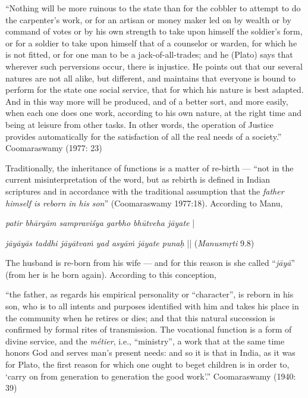 \begin{myquote}
“Nothing will be more ruinous to the state than for the cobbler to attempt to do the carpenter’s work, or for an artisan or money maker led on by wealth or by command of votes or by his own strength to take upon himself the soldier’s form, or for a soldier to take upon himself that of a counselor or warden, for which he is not fitted, or for one man to be a jack-of-all-trades; and he (Plato) says that wherever such perversions occur, there is injustice. He points out that our several natures are not all alike, but different, and maintains that everyone is bound to perform for the state one social service, that for which his nature is best adapted. And in this way more will be produced, and of a better sort, and more easily, when each one does one work, according to his own nature, at the right time and being at leisure from other tasks. In other words, the operation of Justice provides automatically for the satisfaction of all the real needs of a society.”
\hfill Coomaraswamy (1977: 23)
\end{myquote}

Traditionally, the inheritance of functions is a matter of re-birth --- “not in the current misinterpretation of the word, but as rebirth is defined in Indian scriptures and in accordance with the traditional assumption that the {\sl father himself is reborn in his son}” (Coomaraswamy 1977:18). According to Manu, 

\begin{myquote}
{{\sl patir bhāryām sampraviśya garbho bhūtveha jāyate}} |

{\sl jāyāyās taddhi jāyātvaṁ yad asyāṁ jāyate punaḥ} || ({\sl Manusmṛti} 9.8) 
\end{myquote}

The husband is re-born from his wife --- and for this reason is she called “{\sl jāyā}” (from her is he born again). According to this conception, 

\begin{myquote}
“the father, as regards his empirical personality or “character”, is reborn in his son, who is to all intents and purposes identified with him and takes his place in the community when he retires or dies; and that this natural succession is confirmed by formal rites of transmission. The vocational function is a form of divine service, and the {\sl métier}, i.e., “ministry”, a work that at the same time honors God and serves man’s present needs: and so it is that in India, as it was for Plato, the first reason for which one ought to beget children is in order to, ‘carry on from generation to generation the good work’.”
\hfill Coomaraswamy (1940: 39)
\end{myquote}

